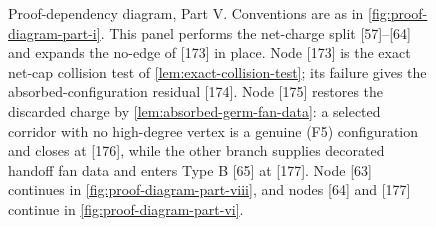 \documentclass[11pt]{article}
\begin{document}
\begin{figure}[p]
{%
}
\caption[Proof-dependency diagram, Part V]{Proof-dependency diagram, Part V.  Conventions are as in \cref{fig:proof-diagram-part-i}.  This panel performs the net-charge split [57]--[64] and expands the no-edge of [173] in place.  Node [173] is the exact net-cap collision test of \cref{lem:exact-collision-test}; its failure gives the absorbed-configuration residual [174].  Node [175] restores the discarded charge by \cref{lem:absorbed-germ-fan-data}: a selected corridor with no high-degree vertex is a genuine (F5) configuration and closes at [176], while the other branch supplies decorated handoff fan data and enters Type B [65] at [177].  Node [63] continues in \cref{fig:proof-diagram-part-viii}, and nodes [64] and [177] continue in \cref{fig:proof-diagram-part-vi}.}
\label{fig:proof-diagram-part-v}
\end{figure}

\clearpage
\end{document}
